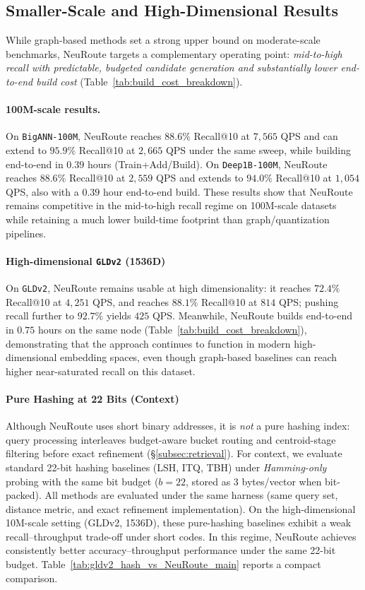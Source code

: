 \documentclass[sigconf, nonacm]{acmart}
\begin{document}
\subsection{Smaller-Scale and High-Dimensional Results}
\label{subsec:small_and_highdim}

While graph-based methods set a strong upper bound on moderate-scale benchmarks, NeuRoute targets a complementary operating point: \emph{mid-to-high recall with predictable, budgeted candidate generation and substantially lower end-to-end build cost} (Table~\ref{tab:build_cost_breakdown}).

\paragraph{100M-scale results.}
On \texttt{BigANN-100M}, NeuRoute reaches $88.6\%$ Recall@10 at $7{,}565$ QPS and can extend to $95.9\%$ Recall@10 at $2{,}665$ QPS under the same sweep, while building end-to-end in $0.39$ hours (Train+Add/Build).
On \texttt{Deep1B-100M}, NeuRoute reaches $88.6\%$ Recall@10 at $2{,}559$ QPS and extends to $94.0\%$ Recall@10 at $1{,}054$ QPS, also with a $0.39$ hour end-to-end build.
These results show that NeuRoute remains competitive in the mid-to-high recall regime on 100M-scale datasets while retaining a much lower build-time footprint than graph/quantization pipelines.

\paragraph{High-dimensional \texttt{GLDv2} (1536D)}
On \texttt{GLDv2}, NeuRoute remains usable at high dimensionality: it reaches $72.4\%$ Recall@10 at $4{,}251$ QPS, and reaches $88.1\%$ Recall@10 at $814$ QPS; pushing recall further to $92.7\%$ yields $425$ QPS.
Meanwhile, NeuRoute builds end-to-end in $0.75$ hours on the same node (Table~\ref{tab:build_cost_breakdown}), demonstrating that the approach continues to function in modern high-dimensional embedding spaces, even though graph-based baselines can reach higher near-saturated recall on this dataset.

\paragraph{Pure Hashing at 22 Bits (Context)}
\label{subsec:hashing_context}

Although NeuRoute uses short binary addresses, it is \emph{not} a pure hashing index:
query processing interleaves budget-aware bucket routing and centroid-stage filtering
before exact refinement (\S\ref{subsec:retrieval}).
For context, we evaluate standard 22-bit hashing baselines (LSH, ITQ, TBH) under
\emph{Hamming-only} probing with the same bit budget ($b=22$, stored as 3 bytes/vector when bit-packed).
All methods are evaluated under the same harness (same query set, distance metric, and exact refinement implementation).
On the high-dimensional 10M-scale setting (GLDv2, 1536D), these pure-hashing baselines exhibit a weak
recall--throughput trade-off under short codes. In this regime, NeuRoute achieves consistently better
accuracy--throughput performance under the same 22-bit budget. Table~\ref{tab:gldv2_hash_vs_NeuRoute_main}
reports a compact comparison.
\end{document}
